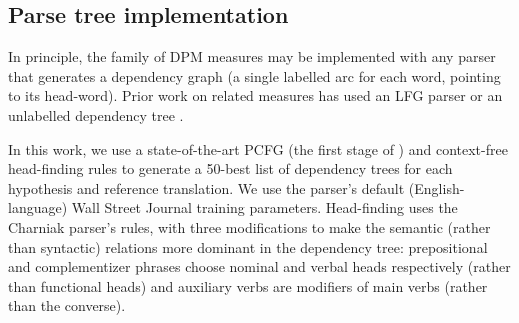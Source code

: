 \documentclass{kluwer}    %
\begin{document}
\begin{article}
\subsection{Parse tree implementation}
In principle, the family of DPM measures may be implemented with
any parser that generates a dependency graph (a single labelled arc
for each word, pointing to its head-word). Prior work
\cite{owczarzak07evaluatingmt} on related
measures has used an LFG parser \cite{cahill04lfg} or
an unlabelled dependency tree \cite{liu05syntaxformteval}. 

In this work, we use a state-of-the-art PCFG (the first stage of
) and context-free head-finding
rules \cite{magerman95headfinding} to generate a 50-best list of
dependency trees for each hypothesis and reference translation.  We
use the parser's default (English-language) Wall Street Journal
training parameters.  Head-finding uses the Charniak parser's rules,
with three modifications to make the semantic (rather than syntactic)
relations more dominant in the dependency tree: prepositional and
complementizer phrases choose nominal and verbal heads respectively
(rather than functional heads) and auxiliary verbs are modifiers of
main verbs (rather than the converse).


\end{article}
\end{document}

